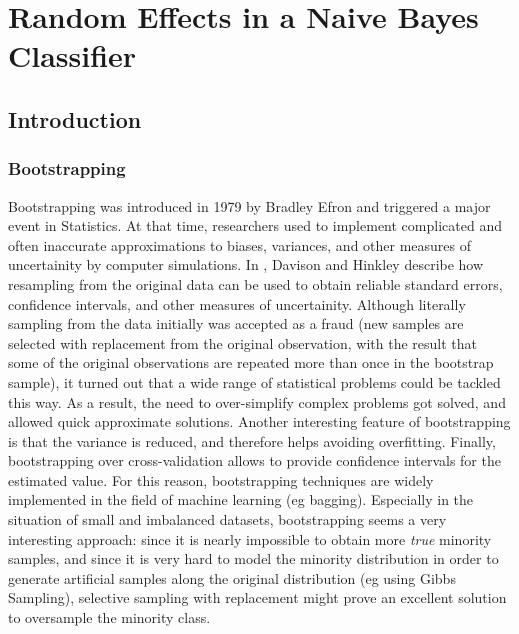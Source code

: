 \chapter{Random Effects in a Naive Bayes Classifier}
\section{Introduction}
\subsection{Bootstrapping}
Bootstrapping was introduced in 1979 by Bradley Efron and triggered a major event in Statistics. At that time, researchers used to implement complicated and often inaccurate approximations to biases, variances, and other measures of uncertainity by computer simulations. In \cite{BootstrapMethods97}, Davison and Hinkley describe how resampling from the original data can be used to obtain reliable standard errors, confidence intervals, and other measures of uncertainity. Although literally sampling from the data initially was accepted as a fraud (new samples are selected with replacement from the original observation, with the result that some of the original observations are repeated more than once in the bootstrap sample), it turned out that a wide range of statistical problems could be tackled this way. As a result, the need to over-simplify complex problems got solved, and allowed quick approximate solutions. Another interesting feature of bootstrapping is that the variance is reduced, and therefore helps avoiding overfitting. Finally, bootstrapping over cross-validation allows to provide confidence intervals for the estimated value. For this reason, bootstrapping techniques are widely implemented in the field of machine learning (eg bagging). Especially in the situation of small and imbalanced datasets, bootstrapping seems a very interesting approach: since it is nearly impossible to obtain more \textit{true} minority samples, and since it is very hard to model the minority distribution in order to generate artificial samples along the original distribution (eg using Gibbs Sampling), selective sampling with replacement might prove an excellent solution to oversample the minority class. 

\newpage 
